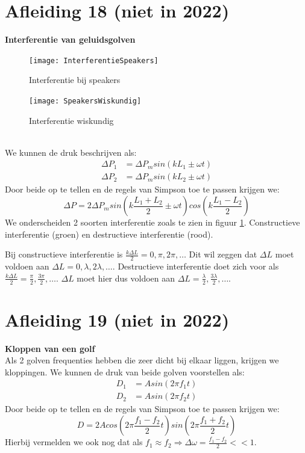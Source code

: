 \documentclass[a4paper,kul]{kulakarticle} %
\begin{document}
\section{Afleiding 18 (niet in 2022)}
\textbf{Interferentie van geluidsgolven}\\
\begin{figure}[h]
	\centering
	\texttt{[image: InterferentieSpeakers]}
	\caption[Interferentie]{Interferentie bij speakers}
	\label{fig:interferentiespeakers}
\end{figure}
\begin{figure}[h]
	\centering
	\texttt{[image: SpeakersWiskundig]}
	\caption[Interferentie wiskundig]{Interferentie wiskundig}
	\label{fig:speakerswiskundig}
\end{figure}\\
We kunnen de druk beschrijven als:
\begin{align*}
	\Delta P_1 &= \Delta P_msin(kL_1\pm\omega t)\\
	\Delta P_2 &= \Delta P_msin(kL_2\pm\omega t)
\end{align*}
Door beide op te tellen en de regels van Simpson toe te passen krijgen we:
\begin{equation*}
	\Delta P = 2\Delta P_msin(k\frac{L_1+L_2}{2}\pm\omega t)cos(k\frac{L_1-L_2}{2})
\end{equation*}
We onderscheiden 2 soorten interferentie zoals te zien in figuur \ref{fig:interferentiespeakers}. Constructieve interferentie (groen) en destructieve interferentie (rood).

Bij constructieve interferentie is $\frac{k\Delta L}{2}=0,\pi,2\pi,\ldots$ Dit wil zeggen dat $\Delta L$ moet voldoen aan $\Delta L = 0,\lambda,2\lambda,\ldots$. Destructieve interferentie doet zich voor als $\frac{k\Delta L}{2}=\frac{\pi}{2},\frac{3\pi}{2},\ldots$. $\Delta L$ moet hier dus voldoen aan $\Delta L = \frac{\lambda}{2},\frac{3\lambda}{2},\ldots$.

\newpage
\section{Afleiding 19 (niet in 2022)}
\textbf{Kloppen van een golf}\\
Als 2 golven frequenties hebben die zeer dicht bij elkaar liggen, krijgen we kloppingen. We kunnen de druk van beide golven voorstellen als:
\begin{align*}
	D_1&=Asin(2\pi f_1t)\\
	D_2&=Asin(2\pi f_2t)
\end{align*}
Door beide op te tellen en de regels van Simpson toe te passen krijgen we:
\begin{equation*}
	D=2Acos(2\pi\frac{f_1-f_2}{2}t)sin(2\pi\frac{f_1+f_2}{2}t)
\end{equation*}
Hierbij vermelden we ook nog dat als $f_1\approx f_2\Rightarrow\Delta\omega=\frac{f_1-f_2}{2}<<1$.
\end{document}
